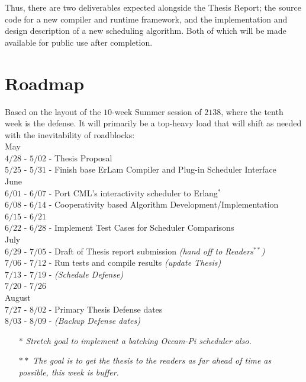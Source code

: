 Thus, there are two deliverables expected alongside the Thesis Report; the source code for a new compiler 
and runtime framework, and the implementation and design description of a new scheduling algorithm. Both
of which will be made available for public use after completion.

\section{Roadmap}

Based on the layout of the $10$-week Summer session of $2138$, where the tenth week
is the defense. It will primarily be a top-heavy load that will shift as needed
with the inevitability of roadblocks:\\

    May\\
    	$4/28$ - $5/02$ - Thesis Proposal\\
        $5/25$ - $5/31$ - Finish base ErLam Compiler and Plug-in Scheduler Interface \\

    June \\
        $6/01$ - $6/07$ - Port CML's interactivity scheduler to Erlang$^*$\\
        $6/08$ - $6/14$ - Cooperativity based Algorithm Development/Implementation \\
        $6/15$ - $6/21$ \\
        $6/22$ - $6/28$ - Implement Test Cases for Scheduler Comparisons\\

    July\\
        $6/29$ - $7/05$ - Draft of Thesis report submission {\em (hand off to Readers$^{**}$)} \\
        $7/06$ - $7/12$ - Run tests and compile results {\em (update Thesis)} \\
        $7/13$ - $7/19$ - {\em(Schedule Defense)}\\
        $7/20$ - $7/26$ \\

    August\\
        $7/27$ - $8/02$ - Primary Thesis Defense dates\\
        $8/03$ - $8/09$ - {\em(Backup Defense dates)}

\begin{itemize}
\setlength{\itemsep}{1pt}
\setlength{\parskip}{0pt}
\setlength{\parsep}{0pt}
\item[$*$]{\small\em Stretch goal to implement a batching Occam-Pi scheduler also.}
\item[$**$]{\small\em The goal is to get the thesis to the readers as far ahead of time as possible, this week is buffer.}
\end{itemize}

